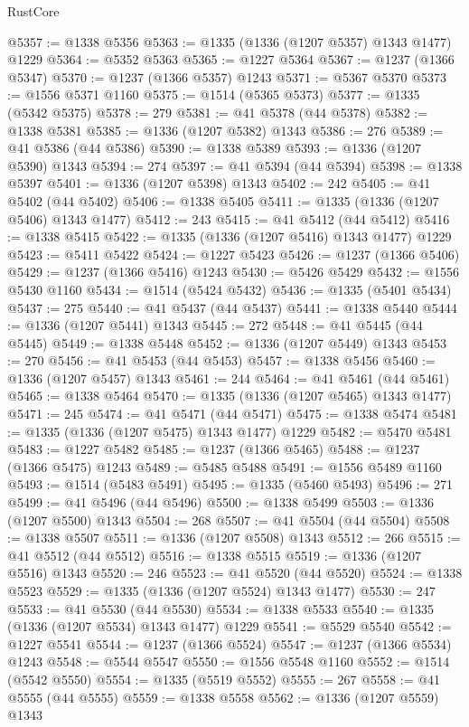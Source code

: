 \begin{lexlean}{RustCore}
\begin{coremodule}
@5357 := @1338 @5356
@5363 := @1335 (@1336 (@1207 @5357) @1343 @1477) @1229
@5364 := @5352 @5363
@5365 := @1227 @5364
@5367 := @1237 (@1366 @5347)
@5370 := @1237 (@1366 @5357) @1243
@5371 := @5367 @5370
@5373 := @1556 @5371 @1160
@5375 := @1514 (@5365 @5373)
@5377 := @1335 (@5342 @5375)
@5378 := 279
@5381 := @41 @5378 (@44 @5378)
@5382 := @1338 @5381
@5385 := @1336 (@1207 @5382) @1343
@5386 := 276
@5389 := @41 @5386 (@44 @5386)
@5390 := @1338 @5389
@5393 := @1336 (@1207 @5390) @1343
@5394 := 274
@5397 := @41 @5394 (@44 @5394)
@5398 := @1338 @5397
@5401 := @1336 (@1207 @5398) @1343
@5402 := 242
@5405 := @41 @5402 (@44 @5402)
@5406 := @1338 @5405
@5411 := @1335 (@1336 (@1207 @5406) @1343 @1477)
@5412 := 243
@5415 := @41 @5412 (@44 @5412)
@5416 := @1338 @5415
@5422 := @1335 (@1336 (@1207 @5416) @1343 @1477) @1229
@5423 := @5411 @5422
@5424 := @1227 @5423
@5426 := @1237 (@1366 @5406)
@5429 := @1237 (@1366 @5416) @1243
@5430 := @5426 @5429
@5432 := @1556 @5430 @1160
@5434 := @1514 (@5424 @5432)
@5436 := @1335 (@5401 @5434)
@5437 := 275
@5440 := @41 @5437 (@44 @5437)
@5441 := @1338 @5440
@5444 := @1336 (@1207 @5441) @1343
@5445 := 272
@5448 := @41 @5445 (@44 @5445)
@5449 := @1338 @5448
@5452 := @1336 (@1207 @5449) @1343
@5453 := 270
@5456 := @41 @5453 (@44 @5453)
@5457 := @1338 @5456
@5460 := @1336 (@1207 @5457) @1343
@5461 := 244
@5464 := @41 @5461 (@44 @5461)
@5465 := @1338 @5464
@5470 := @1335 (@1336 (@1207 @5465) @1343 @1477)
@5471 := 245
@5474 := @41 @5471 (@44 @5471)
@5475 := @1338 @5474
@5481 := @1335 (@1336 (@1207 @5475) @1343 @1477) @1229
@5482 := @5470 @5481
@5483 := @1227 @5482
@5485 := @1237 (@1366 @5465)
@5488 := @1237 (@1366 @5475) @1243
@5489 := @5485 @5488
@5491 := @1556 @5489 @1160
@5493 := @1514 (@5483 @5491)
@5495 := @1335 (@5460 @5493)
@5496 := 271
@5499 := @41 @5496 (@44 @5496)
@5500 := @1338 @5499
@5503 := @1336 (@1207 @5500) @1343
@5504 := 268
@5507 := @41 @5504 (@44 @5504)
@5508 := @1338 @5507
@5511 := @1336 (@1207 @5508) @1343
@5512 := 266
@5515 := @41 @5512 (@44 @5512)
@5516 := @1338 @5515
@5519 := @1336 (@1207 @5516) @1343
@5520 := 246
@5523 := @41 @5520 (@44 @5520)
@5524 := @1338 @5523
@5529 := @1335 (@1336 (@1207 @5524) @1343 @1477)
@5530 := 247
@5533 := @41 @5530 (@44 @5530)
@5534 := @1338 @5533
@5540 := @1335 (@1336 (@1207 @5534) @1343 @1477) @1229
@5541 := @5529 @5540
@5542 := @1227 @5541
@5544 := @1237 (@1366 @5524)
@5547 := @1237 (@1366 @5534) @1243
@5548 := @5544 @5547
@5550 := @1556 @5548 @1160
@5552 := @1514 (@5542 @5550)
@5554 := @1335 (@5519 @5552)
@5555 := 267
@5558 := @41 @5555 (@44 @5555)
@5559 := @1338 @5558
@5562 := @1336 (@1207 @5559) @1343

\end{coremodule}
\end{lexlean}
